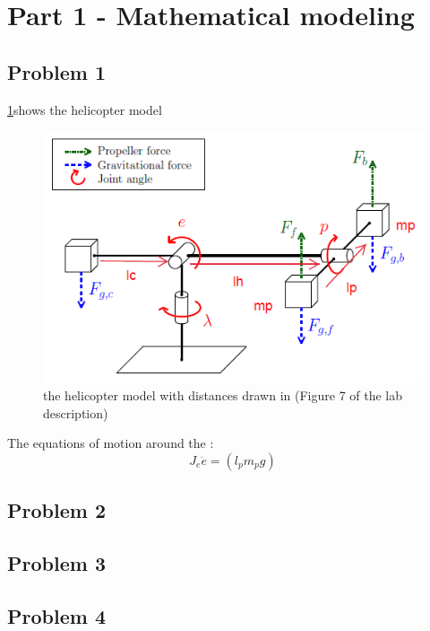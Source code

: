 
\section{Part 1 - Mathematical modeling}
\subsection{Problem 1}
\cref{fig:helicopter_model}shows the helicopter model 
\begin{figure}[hbp]
\caption{the helicopter model with distances drawn in (Figure 7 of the lab description)}
\label{fig:helicopter_model}
\includegraphics[width=\textwidth]{images/helicopter_model}
\end{figure}
The equations of motion around the :
\begin{equation}
J_e\ddot{e} = (l_pm_pg) 
\end{equation}
\subsection{Problem 2}
\subsection{Problem 3}
\subsection{Problem 4}
